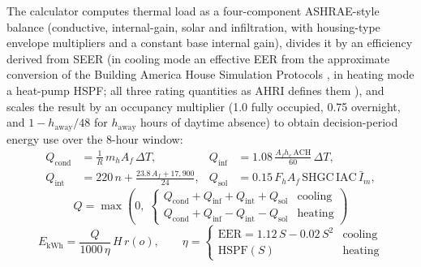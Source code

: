 \documentclass[final,3p,times]{elsarticle}
\begin{document}
The calculator computes thermal load as a four-component ASHRAE-style balance \cite{accamanualj} (conductive, internal-gain, solar and infiltration, with housing-type envelope multipliers and a constant base internal gain), divides it by an efficiency derived from SEER (in cooling mode an effective EER from the approximate conversion of the Building America House Simulation Protocols \cite{hendron2010hsp}, in heating mode a heat-pump HSPF; all three rating quantities as AHRI defines them \cite{ahri2008}), and scales the result by an occupancy multiplier (1.0 fully occupied, 0.75 overnight, and $1 - h_{\mathrm{away}}/48$ for $h_{\mathrm{away}}$ hours of daytime absence) to obtain decision-period energy use over the 8-hour window:
\begin{equation}
\begin{aligned}
  Q_{\mathrm{cond}} &= \tfrac{1}{R}\,m_h A_f\,\Delta T, &
  Q_{\mathrm{inf}}  &= 1.08\,\tfrac{A_f h_c\,\mathrm{ACH}}{60}\,\Delta T, \\[2pt]
  Q_{\mathrm{int}}  &= 220\,n + \tfrac{23.8\,A_f + 17{,}900}{24}, &
  Q_{\mathrm{sol}}  &= 0.15\,F_h A_f\,\mathrm{SHGC}\,\mathrm{IAC}\,\bar{I}_m,
\end{aligned}
  \label{eq:hvac_load}
\end{equation}
\begin{equation}
  Q = \max\!\left(0,\;
  \begin{cases}
    Q_{\mathrm{cond}} + Q_{\mathrm{inf}} + Q_{\mathrm{int}} + Q_{\mathrm{sol}} & \text{cooling} \\[3pt]
    Q_{\mathrm{cond}} + Q_{\mathrm{inf}} - Q_{\mathrm{int}} - Q_{\mathrm{sol}} & \text{heating}
  \end{cases}\right)
  \label{eq:hvac_load_total}
\end{equation}
\begin{equation}
  E_{\mathrm{kWh}} = \frac{Q}{1000\,\eta}\,H\,r(o),
  \qquad
  \eta = \begin{cases}
    \mathrm{EER} = 1.12\,S - 0.02\,S^{2} & \text{cooling} \\
    \mathrm{HSPF}(S)                      & \text{heating}
  \end{cases}
  \label{eq:hvac_energy}
\end{equation}
\end{document}
